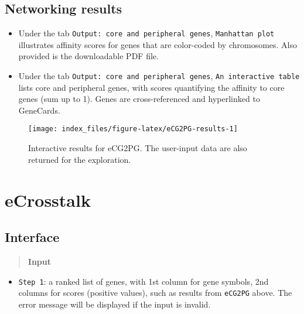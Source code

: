 \documentclass[
  oneside]{book}
\providecommand{\tightlist}{%
  \setlength{\itemsep}{0pt}\setlength{\parskip}{0pt}}
\begin{document}
\hypertarget{networking-results}{%
\section{Networking results}\label{networking-results}}

\begin{itemize}
\item
  Under the tab \texttt{Output:\ core\ and\ peripheral\ genes}, \texttt{Manhattan\ plot} illustrates affinity scores for genes that are color-coded by chromosomes. Also provided is the downloadable PDF file.
\item
  Under the tab \texttt{Output:\ core\ and\ peripheral\ genes}, \texttt{An\ interactive\ table} lists core and peripheral genes, with scores quantifying the affinity to core genes (sum up to 1). Genes are cross-referenced and hyperlinked to GeneCards.
\end{itemize}

\begin{figure}

{\centering \texttt{[image: index\_files/figure-latex/eCG2PG-results-1]} 

}

\caption{Interactive results for eCG2PG. The user-input data are also returned for the exploration.}\label{fig:eCG2PG-results}
\end{figure}

\hypertarget{ecrosstalk}{%
\chapter{eCrosstalk}\label{ecrosstalk}}

\hypertarget{interface-2}{%
\section{Interface}\label{interface-2}}

\begin{quote}
\textbf{Input}
\end{quote}

\begin{itemize}
\tightlist
\item
  \texttt{Step\ 1}: a ranked list of genes, with 1st column for gene symbols, 2nd columns for scores (positive values), such as results from \texttt{eCG2PG} above. The error message will be displayed if the input is invalid.
\end{itemize}
\end{document}
